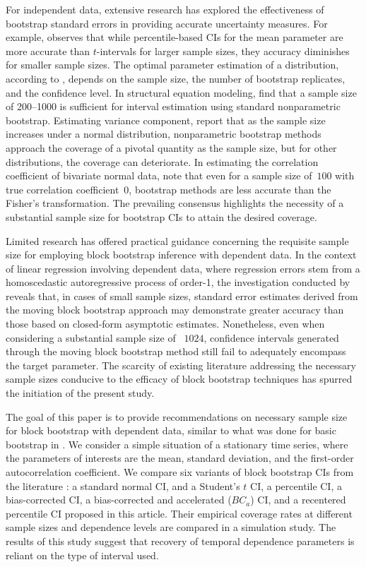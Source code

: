 \documentclass[12pt, letterpaper, titlepage]{article}
\begin{document}
For independent data, extensive research has explored the effectiveness of
bootstrap standard errors in providing accurate uncertainty measures. For
example, \citet{hesterberg2015teachers} observes that while percentile-based
CIs for the mean parameter are more accurate than $t$-intervals for larger
sample sizes, they accuracy diminishes for smaller sample sizes. The optimal
parameter estimation of a distribution, according to
\citet{chernick2009revisiting}, depends on the sample size, the number of
bootstrap replicates, and the confidence level. In structural equation
modeling, \citet{nevitt2001performance} find that a sample size of 200--1000
is sufficient for interval estimation using standard nonparametric bootstrap.
Estimating variance component, \citet{burch2012nonparametric} report that as
the sample size increases under a normal distribution, nonparametric bootstrap
methods approach the coverage of a pivotal quantity as the sample size, but
for other distributions, the coverage can deteriorate. In estimating the
correlation coefficient of bivariate normal data, \citet{puth2015variety} note
that even for a sample size of~$100$ with true correlation coefficient~0,
bootstrap methods are less accurate than the Fisher's transformation. The
prevailing consensus highlights the necessity of a substantial sample size for
bootstrap CIs to attain the desired coverage.


Limited research has offered practical guidance concerning the requisite sample
size for employing block bootstrap inference with dependent data. In the
context of linear regression involving dependent data, where regression errors
stem from a homoscedastic autoregressive process of order-1, the investigation
conducted by \citet{goncalves2005bootstrap} reveals that, in cases of small
sample sizes, standard error estimates derived from the moving block bootstrap
approach may demonstrate greater accuracy than those based on closed-form
asymptotic estimates. Nonetheless, even when considering a substantial sample
size of ~$1024$, confidence intervals generated through the moving block
bootstrap method still fail to adequately encompass the target parameter. The
scarcity of existing literature addressing the necessary sample sizes
conducive to the efficacy of block bootstrap techniques has spurred the
initiation of the present study.


The goal of this paper is to provide recommendations on necessary sample size
for block bootstrap with dependent data, similar to what was done for basic
bootstrap in \citet{hesterberg2015teachers}. We consider a simple situation of
a stationary time series, where the parameters of interests are the mean,
standard deviation, and the first-order autocorrelation coefficient. We
compare six variants of block bootstrap CIs from the literature
\citep{diciccio1996bootstrap, rice2006mathematical}: a standard normal CI, and
a Student's $t$ CI, a percentile CI, a bias-corrected CI, a bias-corrected and
accelerated ($BC_a$) CI, and a recentered percentile CI proposed in this article.
Their empirical
coverage rates at different sample sizes and dependence levels are compared in
a simulation study. The results of this study suggest that recovery of
temporal dependence parameters is reliant on the type of interval used.
\end{document}
